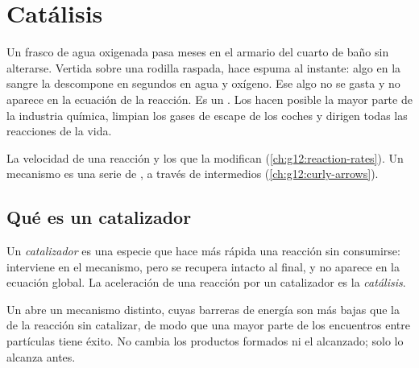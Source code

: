 \chapter{Catálisis}\label{ch:g12:catalysis}

Un frasco de agua oxigenada pasa meses en el armario del cuarto de baño
sin alterarse. Vertida sobre una rodilla raspada, hace espuma al
instante: algo en la sangre la descompone en segundos en agua y oxígeno.
Ese algo no se gasta y no aparece en la ecuación de la reacción. Es un
. Los  hacen posible la mayor parte de la
industria química, limpian los gases de escape de los coches y dirigen
todas las reacciones de la vida.

\begin{recall}
La velocidad de una reacción y los  que la modifican
(\cref{ch:g12:reaction-rates}). Un mecanismo es una serie de , a través de intermedios (\cref{ch:g12:curly-arrows}).
\end{recall}

\section{Qué es un catalizador}

\begin{definition}\label{def:g12:catalysis:catalyst}
Un \emph{catalizador} es una especie que hace más
rápida una reacción sin consumirse: interviene en el mecanismo, pero se
recupera intacto al final, y no aparece en la ecuación global. La
aceleración de una reacción por un catalizador es la
\emph{catálisis}.
\end{definition}

\begin{proposition}\label{prop:g12:catalysis:path}
Un  abre un mecanismo distinto, cuyas barreras de energía son
más bajas que la de la reacción sin catalizar, de modo que una mayor
parte de los encuentros entre partículas tiene éxito. No cambia los
productos formados ni el  alcanzado; solo lo alcanza antes.
\end{proposition}

